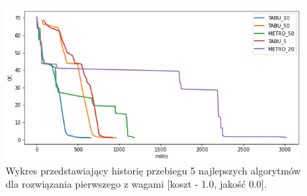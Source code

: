 \begin{figure}[ht]{}
	\centering
	\includegraphics[scale=0.85]{images/solution_1_cqp_1.png}
	\caption {
		 Wykres przedstawiający historię przebiegu 5 najlepszych algorytmów dla rozwiązania pierwszego z wagami [koszt - 1.0, jakość 0.0]. 
	}
	\label{fig:sol-1-w-1}
\end{figure}

